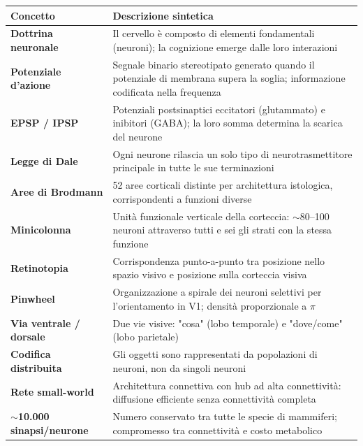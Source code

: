 \begin{table}[htbp]
    \centering
    \renewcommand{\arraystretch}{1.3}
    \begin{tabularx}{\textwidth}{|l|X|}
    \hline
    \textbf{Concetto} & \textbf{Descrizione sintetica} \\
    \hline
    \textbf{Dottrina neuronale} & Il cervello è composto di elementi fondamentali (neuroni); la cognizione emerge dalle loro interazioni \\
    \textbf{Potenziale d'azione} & Segnale binario stereotipato generato quando il potenziale di membrana supera la soglia; informazione codificata nella frequenza \\
    \textbf{EPSP / IPSP} & Potenziali postsinaptici eccitatori (glutammato) e inibitori (GABA); la loro somma determina la scarica del neurone \\
    \textbf{Legge di Dale} & Ogni neurone rilascia un solo tipo di neurotrasmettitore principale in tutte le sue terminazioni \\
    \textbf{Aree di Brodmann} & 52 aree corticali distinte per architettura istologica, corrispondenti a funzioni diverse \\
    \textbf{Minicolonna} & Unità funzionale verticale della corteccia: $\sim$80–100 neuroni attraverso tutti e sei gli strati con la stessa funzione \\
    \textbf{Retinotopia} & Corrispondenza punto-a-punto tra posizione nello spazio visivo e posizione sulla corteccia visiva \\
    \textbf{Pinwheel} & Organizzazione a spirale dei neuroni selettivi per l'orientamento in V1; densità proporzionale a $\pi$ \\
    \textbf{Via ventrale / dorsale} & Due vie visive: "cosa" (lobo temporale) e "dove/come" (lobo parietale) \\
    \textbf{Codifica distribuita} & Gli oggetti sono rappresentati da popolazioni di neuroni, non da singoli neuroni \\
    \textbf{Rete small-world} & Architettura connettiva con hub ad alta connettività: diffusione efficiente senza connettività completa \\
    \textbf{$\sim$10.000 sinapsi/neurone} & Numero conservato tra tutte le specie di mammiferi; compromesso tra connettività e costo metabolico \\
    \hline
    \end{tabularx}
\end{table}
